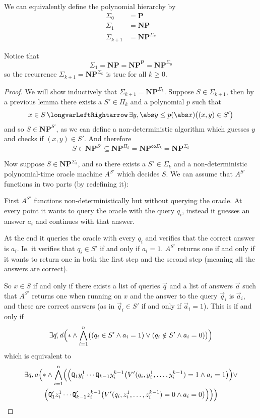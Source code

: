 \documentclass[10pt]{article}
\def\iff{\,\longvarLeftRightarrow\,}
\def\quant{\mathtt{Q}}
\def\P{\mathbf{P}}
\def\NP{\mathbf{NP}}
\def\co{\mathsf{co}}
\begin{document}
\begin{prop*}

    We can equivalently define the polynomial hierarchy by
    \begin{align*}
        \Sigma_0 &= \P \\
        \Sigma_1 &= \NP \\
        \Sigma_{k+1} &= \NP^{\Sigma_k}
    \end{align*}

\end{prop*}

Notice that
\[ \Sigma_1 = \NP = \NP^\P = \NP^{\Sigma_0} \]
so the recurrence $\Sigma_{k+1}=\NP^{\Sigma_k}$ is true for all $k\geq0$.

\begin{proof}

    We will show inductively that $\Sigma_{k+1}=\NP^{\Sigma_k}$.
    Suppose $S\in\Sigma_{k+1}$, then by a previous lemma there exists a $S'\in\Pi_k$ and a polynomial $p$ such that
    \[ x\in S\iff \exists y,\abs y\leq p(\abs x)\bigl((x,y)\in S'\bigr) \]
    and so $S\in\NP^{S'}$, as we can define a non-deterministic algorithm which guesses $y$ and checks if $(x,y)\in S'$.
    And therefore
    \[ S\in\NP^{S'}\subseteq\NP^{\Pi_k} = \NP^{\co\Sigma_k} = \NP^{\Sigma_k} \]

    Now suppose $S\in\NP^{\Sigma_k}$, and so there exists a $S'\in\Sigma_k$ and a non-deterministic polynomial-time oracle machine $A^{S'}$ which decides $S$.
    We can assume that $A^{S'}$ functions in two parts (by redefining it):
    \benum
        \item First $A^{S'}$ functions non-deterministically but without querying the oracle.
        At every point it wants to query the oracle with the query $q_i$, instead it guesses an answer $a_i$ and continues with that answer.
        \item At the end it queries the oracle with every $q_i$ and verifies that the correct answer is $a_i$.
        Ie. it verifies that $q_i\in S'$ if and only if $a_i=1$.
    \eenum
    $A^{S'}$ returns one if and only if it wants to return one in both the first step and the second step (meaning all the answers are correct).

    So $x\in S$ if and only if there exists a list of queries $\vec q$ and a list of answers $\vec a$ such that $A^{S'}$ returns one when running on $x$ and the answer to the query $\vec q_i$ is $\vec a_i$,
    and these are correct answers (as in $\vec q_i\in S'$ if and only if $\vec a_i=1$).
    This is if and only if
    \[ \exists \vec q,\vec a\Bigl(*\land\bigwedge_{i=1}^n\bigl((q_i\in S'\land a_i=1)\lor(q_i\notin S'\land a_i=0)\bigr)\Bigr) \]
    which is equivalent to
    \begin{multline*}
        \exists q,a\Bigl(*\land\bigwedge_{i=1}^n\Bigl(\Bigl(\quant_1 y_i^1\cdots\quant_{k-1}y_i^{k-1}\bigl(V'(q_i,y_i^1,\dots,y_i^{k-1})=1\land a_i=1\bigr)\Bigr)\lor\\
        \Bigl(\quant'_1 z_i^1\cdots\quant'_{k-1}z_i^{k-1}\bigl(V'(q_i,z_i^1,\dots,z_i^{k-1})=0\land a_i=0\bigr)\Bigr)\Bigr)\Bigr)
    \end{multline*}


\end{proof}
\end{document}
